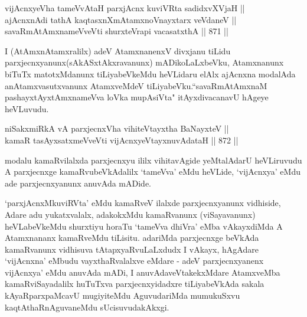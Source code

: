 
\begin{shl}
vijAcnxyeVha tameVvAtaH parxjAcnx kuviVRta sadidxvXVjaH || \\
ajAcnxnAdi tathA kaqtasxnXmAtamxnoV\s nayxtarx veVdaneV || \\
savaRmAtAmxnameVveVti shurxteVrapi vacasatxthA \hfill || 871 ||  
\end{shl}

\begin{artha}
I (AtAmxnAtamxralilx) adeV AtamxnanenxV divxjanu tiLidu parxjecnxyanunx(sAkASxtAkxravanunx) mADikoLaLxbeVku, Atamxnanunx biTuTx matotxMdanunx tiLiyabeVkeMdu heVLidaru elAlx ajAcnxna modalAda anAtamxvasutxvanunx AtamxveMdeV tiLiyabeVku.``savaRmAtAmxnaM pashayxtAyxtAmxnameVva loVka mupAsiVta" itAyxdivacanavU hAgeye heVLuvudu.
\end{artha}


\begin{shl}
niSakxmiRkA vA parxjecnxVha vihiteVtayxtha BaNayxteV || \\
kamaR tasAyxsatxmeVveVti vijAcnxyeVtayxnuvAdataH \hfill || 872 ||  
\end{shl}

\begin{artha}
modalu kamaRvilalxda parxjecnxyu ililx vihitavAgide yeMtalAdarU heVLiruvudu A parxjecnxge kamaRvubeVkAdalilx `tameVva' eMdu heVLide, `vijAcnxya' eMdu ade parxjecnxyanunx anuvAda mADide.
\end{artha}


\begin{artha}
`parxjAcnxMkuviRVta' eMdu kamaRveV ilalxde parxjecnxyanunx vidhiside, Adare adu yukatxvalalx, adakokxMdu kamaRvanunx (viSayavanunx) heVLabeVkeMdu shurxtiyu horaTu `tameVva dhiVra' eMba vAkayxdiMda A Atamxnananx kamaRveMdu tiLisitu. adariMda parxjecnxge beVkAda kamaRvanunx vidhisuva tAtapxyaRvuLaLxdudx I vAkayx, hAgAdare `vijAcnxna' eMbudu vayxthaRvalalxve eMdare - adeV parxjecnxyanenx vijAcnxya' eMdu anuvAda mADi, I anuvAdaveVtakekxMdare AtamxveMba kamaRviSayadalilx huTuTxva parxjecnxyidadxre tiLiyabeVkAda sakala kAyaRparxpaMcavU mugiyiteMdu AguvudariMda mumukuSxvu kaqtAthaRnAguvaneMdu sUcisuvudakAkxgi.
\end{artha}


